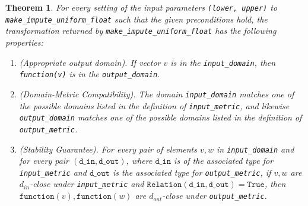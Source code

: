\documentclass[11pt,a4paper]{article}
\newtheorem{theorem}{Theorem}[section]
\newcommand{\din}{\texttt{d\_in}}
\newcommand{\dout}{\texttt{d\_out}}
\newcommand{\Relation}{\texttt{Relation}}
\newcommand{\True}{\texttt{True}}
\newcommand{\function}{\texttt{function}}
\begin{document}
\begin{theorem}
For every setting of the input parameters \texttt{(lower, upper)} to \texttt{make\_impute\_uniform\_float} such that the given preconditions hold, the transformation returned by \texttt{make\_impute\_uniform\_float} has the following properties:
\begin{enumerate}
    \item \textup{(Appropriate output domain).} If vector $v$ is in the \texttt{input\_domain}, then \texttt{function(v)} is in the \texttt{output\_domain}.
    \item \textup{(Domain-Metric Compatibility).} The domain \texttt{input\_domain} matches one of the possible domains listed in the definition of \texttt{input\_metric}, and likewise \texttt{output\_domain} matches one of the possible domains listed in the definition of \texttt{output\_metric}.
    \item \textup{(Stability Guarantee).} For every pair of elements $v, w$ in \texttt{input\_domain} and for every pair $(\din, \dout)$, where $\din$ is of the associated type for \texttt{input\_metric} and $\dout$ is the associated type for \texttt{output\_metric}, if $v,w$ are $d_{in}$-close under \texttt{input\_metric} and $\Relation(\din, \dout) = \True$, then $\function(v), \function(w)$ are $d_{out}$-close under \texttt{output\_metric}.
\end{enumerate}
\end{theorem}
\end{document}
